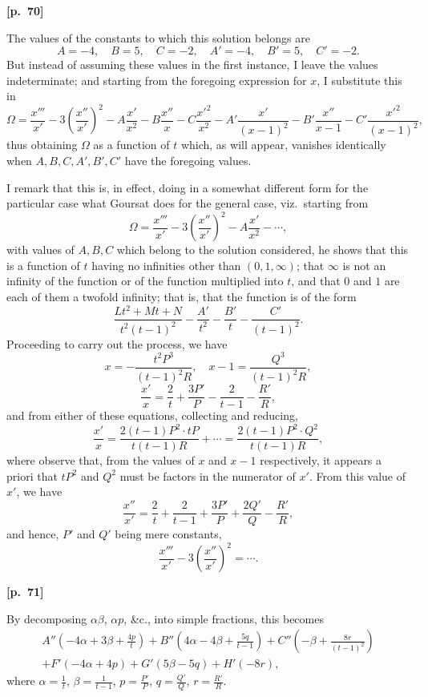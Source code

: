 \documentclass[11pt,a4paper]{book}
\begin{document}
\vspace{0.5em}
\noindent\textbf{[p.\ 70]}

The values of the constants to which this solution belongs are
$$
A = -4, \quad B = 5, \quad C = -2, \quad A' = -4, \quad B' = 5, \quad C' = -2.
$$
But instead of assuming these values in the first instance, I leave the values indeterminate; and starting from the foregoing expression for $x$, I substitute this in
$$
\Omega = \frac{x'''}{x'} - 3\left(\frac{x''}{x'}\right)^2 - A \frac{x'}{x^2} - B \frac{x''}{x} - C \frac{x'^2}{x^2} - A' \frac{x'}{(x - 1)^2} - B' \frac{x''}{x - 1} - C' \frac{x'^2}{(x - 1)^2},
$$
thus obtaining $\Omega$ as a function of $t$ which, as will appear, vanishes identically when $A, B, C, A', B', C'$ have the foregoing values.

I remark that this is, in effect, doing in a somewhat different form for the particular case what Goursat does for the general case, viz.\ starting from
$$
\Omega = \frac{x'''}{x'} - 3\left(\frac{x''}{x'}\right)^2 - A \frac{x'}{x^2} - \cdots,
$$
with values of $A, B, C$ which belong to the solution considered, he shows that this is a function of $t$ having no infinities other than $(0, 1, \infty)$; that $\infty$ is not an infinity of the function or of the function multiplied into $t$, and that $0$ and $1$ are each of them a twofold infinity; that is, that the function is of the form
$$
\frac{Lt^2 + Mt + N}{t^2(t - 1)^2} - \frac{A'}{t^2} - \frac{B'}{t} - \frac{C'}{(t - 1)^2}.
$$
Proceeding to carry out the process, we have
$$
x = -\frac{t^2 P^3}{(t - 1)^2 R}, \quad x - 1 = \frac{Q^3}{(t - 1)^2 R},
$$
$$
\frac{x'}{x} = \frac{2}{t} + \frac{3P'}{P} - \frac{2}{t - 1} - \frac{R'}{R},
$$
and from either of these equations, collecting and reducing,
$$
\frac{x'}{x} = \frac{2(t - 1)P^2 \cdot tP}{t(t - 1)R} + \cdots = \frac{2(t - 1)P^2 \cdot Q^2}{t(t - 1)R},
$$
where observe that, from the values of $x$ and $x - 1$ respectively, it appears a priori that $tP^2$ and $Q^2$ must be factors in the numerator of $x'$. From this value of $x'$, we have
$$
\frac{x''}{x'} = \frac{2}{t} + \frac{2}{t - 1} + \frac{3P'}{P} + \frac{2Q'}{Q} - \frac{R'}{R},
$$
and hence, $P'$ and $Q'$ being mere constants,
$$
\frac{x'''}{x'} - 3\left(\frac{x''}{x'}\right)^2 = \cdots.
$$

\vspace{0.5em}
\noindent\textbf{[p.\ 71]}

By decomposing $\alpha\beta$, $\alpha p$, \&c., into simple fractions, this becomes
\begin{multline*}
A''\left(-4\alpha + 3\beta + \frac{4p}{t}\right) + B''\left(4\alpha - 4\beta + \frac{5q}{t - 1}\right) + C''\left(-\beta + \frac{8r}{(t - 1)^2}\right) \\
+ F'(-4\alpha + 4p) + G'(5\beta - 5q) + H'(-8r),
\end{multline*}
where $\alpha = \frac{1}{t}$, $\beta = \frac{1}{t - 1}$, $p = \frac{P'}{P}$, $q = \frac{Q'}{Q}$, $r = \frac{R'}{R}$.
\end{document}
